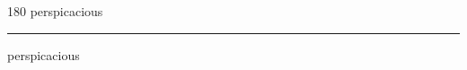 
\begin{frame}
\begin{center}
\begin{turn}{180}
{\fontsize{2.5cm}{1em}\selectfont perspicacious}
\end{turn}
\vspace{1em}\par  
\hrule
\vspace{1em}\par  
{\fontsize{2.5cm}{1em}\selectfont perspicacious}
\end{center}
\end{frame}
